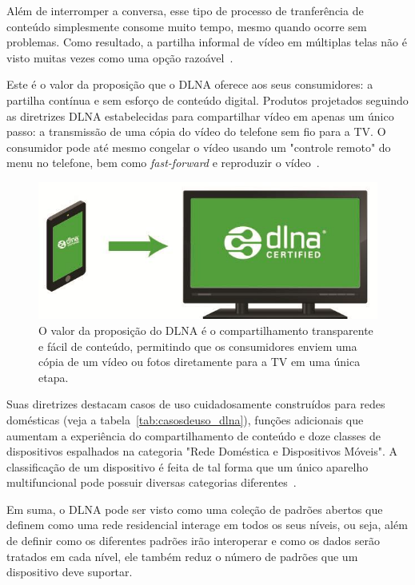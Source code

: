 Além de interromper a conversa, esse tipo de processo de tranferência de conteúdo simplesmente consome muito tempo, mesmo quando ocorre sem problemas. Como resultado, a partilha informal de vídeo em múltiplas telas não é visto muitas vezes como uma opção razoável~\cite{dlnahdvideostreaming}.

Este é o valor da proposição que o DLNA oferece aos seus consumidores: a partilha contínua e sem esforço de conteúdo digital. Produtos projetados seguindo as diretrizes DLNA estabelecidas para compartilhar vídeo em apenas um único passo: a transmissão de uma cópia do vídeo do telefone sem fio para a TV. O consumidor pode até mesmo congelar o vídeo usando um "controle remoto" do menu no telefone, bem como \emph{fast-forward} e reproduzir o vídeo~\cite{dlnahdvideostreaming}.

\begin{figure}[ht]
	\center
	\includegraphics[scale=0.3]{imagens/dlna2}
	\caption{O valor da proposição do DLNA é o compartilhamento transparente e fácil de conteúdo, permitindo que os consumidores enviem uma cópia de um vídeo ou fotos diretamente para a TV em uma única etapa.}
	\label{fig:dlnaProccess}
\end{figure}

Suas diretrizes destacam casos de uso cuidadosamente construídos para redes domésticas (veja a tabela~\ref{tab:casosdeuso_dlna}), funções adicionais que aumentam a experiência do compartilhamento de conteúdo e doze classes de dispositivos espalhados na categoria "Rede Doméstica e Dispositivos Móveis". A classificação de um dispositivo é feita de tal forma que um único aparelho multifuncional pode possuir diversas categorias diferentes~\cite{dlnahdvideostreaming}.

Em suma, o DLNA pode ser visto como uma coleção de padrões abertos que definem como uma rede residencial interage em todos os seus níveis, ou seja, além de definir como os diferentes padrões irão interoperar e como os dados serão tratados em cada nível, ele também reduz o número de padrões que um dispositivo deve suportar.

